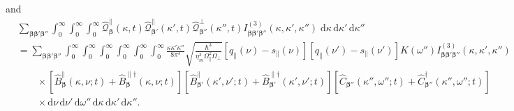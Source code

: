 \documentclass{article}
\begin{document}
and
\begin{equation}
\begin{split}
&\sum_{\bm{\beta}\bm{\beta}'\bm{\beta}''}\int_0^\infty\int_0^\infty\int_0^\infty\hat{\mathcal{Q}}_{\bm{\beta}}^\parallel(\kappa,t)\hat{\mathcal{Q}}_{\bm{\beta}'}^\parallel(\kappa',t)\hat{\mathcal{Q}}_{\bm{\beta}''}^\perp(\kappa'',t)I^{(3)}_{\bm{\beta}\bm{\beta}'\bm{\beta}''}(\kappa,\kappa',\kappa'')\;\mathrm{d}\kappa\,\mathrm{d}\kappa'\,\mathrm{d}\kappa''\\
&= \sum_{\bm{\beta}\bm{\beta}'\bm{\beta}''}\int_0^\infty\int_0^\infty\int_0^\infty\int_0^\infty\int_0^\infty\int_0^\infty\frac{\kappa\kappa'\kappa''}{8\pi^3}\sqrt{\frac{\hbar^3}{\eta_m^3\Omega_\parallel^2\Omega_\perp}}\left[q_\parallel(\nu) - s_\parallel(\nu)\right]\left[q_\parallel(\nu') - s_\parallel(\nu')\right]K(\omega'')I^{(3)}_{\bm{\beta}\bm{\beta}'\bm{\beta}''}(\kappa,\kappa',\kappa'')\\
&\qquad\times\left[\hat{B}_{\bm{\beta}}^\parallel(\kappa,\nu;t) + \hat{B}_{\bm{\beta}}^{\parallel\dagger}(\kappa,\nu;t)\right]\left[\hat{B}_{\bm{\beta}'}^\parallel(\kappa',\nu';t) + \hat{B}_{\bm{\beta}'}^{\parallel\dagger}(\kappa',\nu';t)\right]\left[\hat{C}_{\bm{\beta}''}(\kappa'',\omega'';t) + \hat{C}_{\bm{\beta}''}^\dagger(\kappa'',\omega'';t)\right]\\
&\qquad\times\mathrm{d}\nu\,\mathrm{d}\nu'\,\mathrm{d}\omega''\,\mathrm{d}\kappa\,\mathrm{d}\kappa'\,\mathrm{d}\kappa''.
\end{split}
\end{equation}
\end{document}
